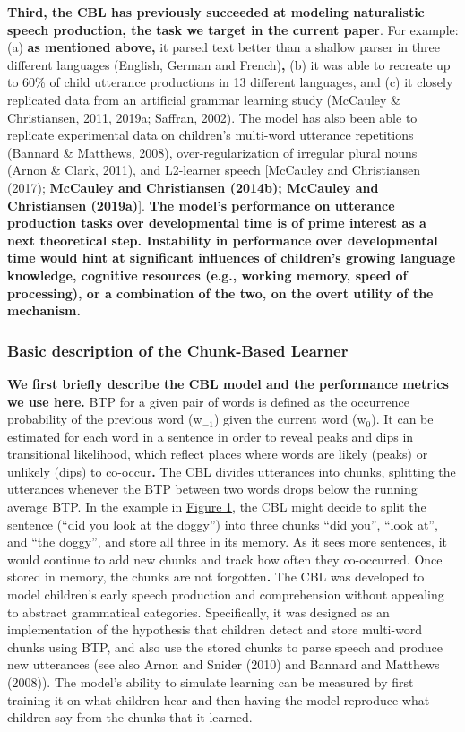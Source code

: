 \documentclass[
  english,
  man,mask,floatsintext]{apa6}
\begin{document}
\textbf{Third, the CBL has previously succeeded at modeling naturalistic speech production, the task we target in the current paper}. For example: (a) \textbf{as mentioned above,} it parsed text better than a shallow parser in three different languages (English, German and French)\textbf{,} (b) it was able to recreate up to 60\% of child utterance productions in 13 different languages, and (c) it closely replicated data from an artificial grammar learning study (McCauley \& Christiansen, 2011, 2019a; Saffran, 2002). The model has also been able to replicate experimental data on children's multi-word utterance repetitions (Bannard \& Matthews, 2008), over-regularization of irregular plural nouns (Arnon \& Clark, 2011), and L2-learner speech {[}McCauley and Christiansen (2017); \textbf{McCauley and Christiansen (2014b); McCauley and Christiansen (2019a)}{]}. \textbf{The model's performance on utterance production tasks over developmental time is of prime interest as a next theoretical step. Instability in performance over developmental time would hint at significant influences of children's growing language knowledge, cognitive resources (e.g., working memory, speed of processing), or a combination of the two, on the overt utility of the mechanism.}

\hypertarget{basic-description-of-the-chunk-based-learner}{%
\subsubsection{\texorpdfstring{\textbf{Basic description of the Chunk-Based Learner}}{Basic description of the Chunk-Based Learner}}\label{basic-description-of-the-chunk-based-learner}}

\textbf{We first briefly describe the CBL model and the performance metrics we use here.} BTP for a given pair of words is defined as the occurrence probability of the previous word (w\(_{-1}\)) given the current word (w\(_0\)). It can be estimated for each word in a sentence in order to reveal peaks and dips in transitional likelihood, which reflect places where words are likely (peaks) or unlikely (dips) to co-occur\textbf{.} The CBL divides utterances into chunks, splitting the utterances whenever the BTP between two words drops below the running average BTP. In the example in \protect\hyperlink{fig1}{Figure 1}, the CBL might decide to split the sentence (\enquote{did you look at the doggy}) into three chunks \enquote{did you}, \enquote{look at}, and \enquote{the doggy}, and store all three in its memory. As it sees more sentences, it would continue to add new chunks and track how often they co-occurred. Once stored in memory, the chunks are not forgotten\textbf{.} The CBL was developed to model children's early speech production and comprehension without appealing to abstract grammatical categories. Specifically, it was designed as an implementation of the hypothesis that children detect and store multi-word chunks using BTP, and also use the stored chunks to parse speech and produce new utterances (see also Arnon and Snider (2010) and Bannard and Matthews (2008)). The model's ability to simulate learning can be measured by first training it on what children hear and then having the model reproduce what children say from the chunks that it learned.
\end{document}
